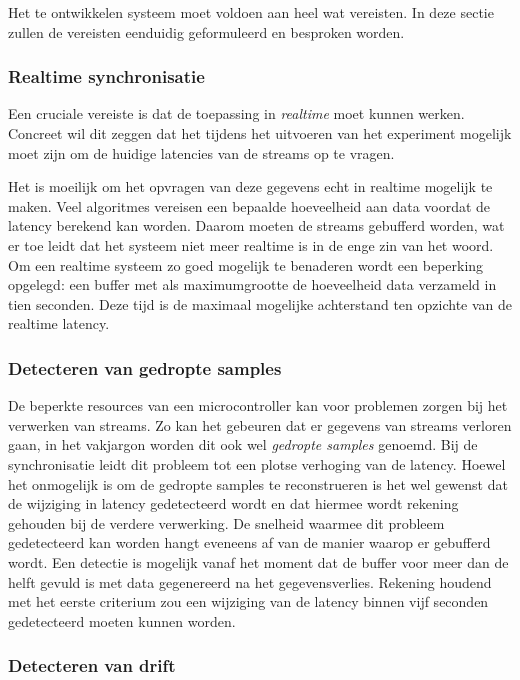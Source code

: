 Het te ontwikkelen systeem moet voldoen aan heel wat vereisten. In deze sectie zullen de vereisten eenduidig geformuleerd en besproken worden.  

\subsubsection{Realtime synchronisatie}

Een cruciale vereiste is dat de toepassing in \textit{realtime} moet kunnen werken. Concreet wil dit zeggen dat het tijdens het uitvoeren van het experiment mogelijk moet zijn om de huidige latencies van de streams op te vragen.

Het is moeilijk om het opvragen van deze gegevens echt in realtime mogelijk te maken. Veel algoritmes vereisen een bepaalde hoeveelheid aan data voordat de latency berekend kan worden. Daarom moeten de streams gebufferd worden, wat er toe leidt dat het systeem niet meer realtime is in de enge zin van het woord. Om een realtime systeem zo goed mogelijk te benaderen wordt een beperking opgelegd: een buffer met als maximumgrootte de hoeveelheid data verzameld in tien seconden. Deze tijd is de maximaal mogelijke achterstand ten opzichte van de realtime latency.

\subsubsection{Detecteren van gedropte samples}

De beperkte resources van een microcontroller kan voor problemen zorgen bij het verwerken van streams. Zo kan het gebeuren dat er gegevens van streams verloren gaan, in het vakjargon worden dit ook wel \textit{gedropte samples} genoemd. Bij de synchronisatie leidt dit probleem tot een plotse verhoging van de latency. Hoewel het onmogelijk is om de gedropte samples te reconstrueren is het wel gewenst dat de wijziging in latency gedetecteerd wordt en dat hiermee wordt rekening gehouden bij de verdere verwerking. De snelheid waarmee dit probleem gedetecteerd kan worden hangt eveneens af van de manier waarop er gebufferd wordt. Een detectie is mogelijk vanaf het moment dat de buffer voor meer dan de helft gevuld is met data gegenereerd na het gegevensverlies. Rekening houdend met het eerste criterium zou een wijziging van de latency binnen vijf seconden gedetecteerd moeten kunnen worden.

\subsubsection{Detecteren van drift}


